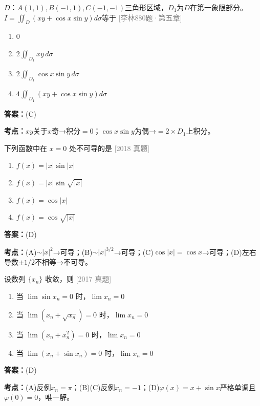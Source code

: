 \documentclass[12pt,a4paper]{ctexbook}
\newcommand{\src}[1]{\hfill\textcolor{gray}{\small\textsf{[#1]}}}
\newcommand{\ans}[1]{\begin{answerbox}\textbf{答案：}#1\end{answerbox}}
\newcommand{\kpt}[1]{\textbf{考点：}#1}
\begin{document}
\bigskip

\begin{exercise}[880题·奇偶性分解]
$D$：$A(1,1),B(-1,1),C(-1,-1)$三角形区域，$D_1$为$D$在第一象限部分。$I=\iint_D(xy+\cos x\sin y)d\sigma$等于 \hfill\src{李林880题·第五章}
\begin{enumerate}[label=(\Alph*),nosep]
  \item $0$
  \item $2\iint_{D_1}xy\,d\sigma$
  \item $2\iint_{D_1}\cos x\sin y\,d\sigma$
  \item $4\iint_{D_1}(xy+\cos x\sin y)d\sigma$
\end{enumerate}
\end{exercise}
\ans{(C)}
\kpt{$xy$关于$x$奇→积分$=0$；$\cos x\sin y$为偶→$=2\times D_1$上积分。}

\bigskip

\begin{exercise}
下列函数中在 $x=0$ 处不可导的是 \hfill\src{2018 真题}
\begin{enumerate}[label=(\Alph*),nosep]
  \item $f(x)=|x|\sin|x|$
  \item $f(x)=|x|\sin\sqrt{|x|}$
  \item $f(x)=\cos|x|$
  \item $f(x)=\cos\sqrt{|x|}$
\end{enumerate}
\end{exercise}
\ans{(D)}
\kpt{(A)$\sim|x|^2$→可导；(B)$\sim|x|^{3/2}$→可导；(C)$\cos|x|=\cos x$→可导；(D)左右导数$\pm 1/2$不相等→不可导。}

\bigskip

\begin{exercise}
设数列 $\{x_n\}$ 收敛，则 \hfill\src{2017 真题}
\begin{enumerate}[label=(\Alph*),nosep]
  \item 当 $\lim\sin x_n=0$ 时，$\lim x_n=0$
  \item 当 $\lim(x_n+\sqrt{x_n})=0$ 时，$\lim x_n=0$
  \item 当 $\lim(x_n+x_n^2)=0$ 时，$\lim x_n=0$
  \item 当 $\lim(x_n+\sin x_n)=0$ 时，$\lim x_n=0$
\end{enumerate}
\end{exercise}
\ans{(D)}
\kpt{(A)反例$x_n=\pi$；(B)(C)反例$x_n=-1$；(D)$\varphi(x)=x+\sin x$严格单调且$\varphi(0)=0$，唯一解。}

\bigskip
\end{document}
